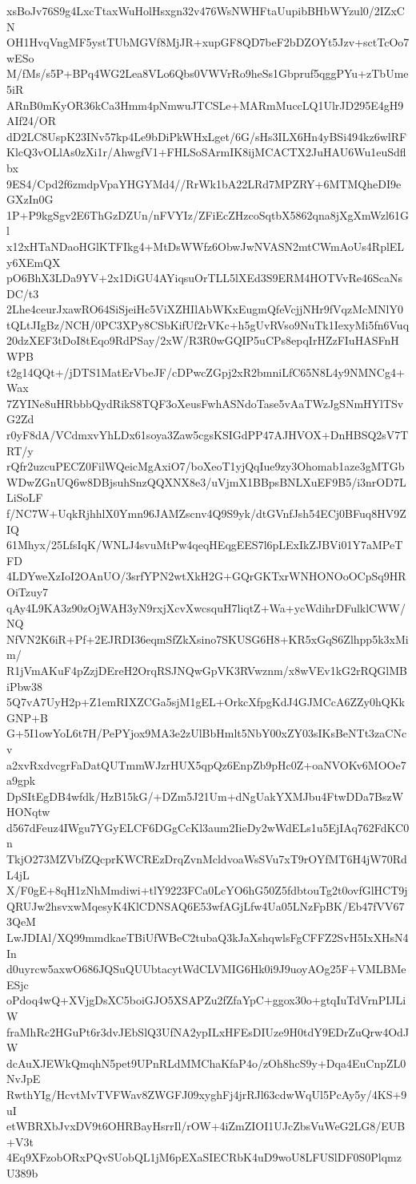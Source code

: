 xsBoJv76S9g4LxcTtaxWuHolHsxgn32v476WsNWHFtaUupibBHbWYzul0/2IZxCN
OH1HvqVngMF5ystTUbMGVf8MjJR+xupGF8QD7beF2bDZOYt5Jzv+sctTcOo7wESo
M/fMs/s5P+BPq4WG2Lea8VLo6Qbs0VWVrRo9heSs1Gbpruf5qggPYu+zTbUme5iR
ARnB0mKyOR36kCa3Hmm4pNmwuJTCSLe+MARmMuccLQ1UlrJD295E4gH9AIf24/OR
dD2LC8UspK23INv57kp4Le9bDiPkWHxLget/6G/sHs3ILX6Hn4yBSi494kz6wlRF
KlcQ3vOLlAs0zXi1r/AhwgfV1+FHLSoSArmIK8ijMCACTX2JuHAU6Wu1euSdflbx
9ES4/Cpd2f6zmdpVpaYHGYMd4//RrWk1bA22LRd7MPZRY+6MTMQheDI9eGXzIn0G
1P+P9kgSgv2E6ThGzDZUn/nFVYIz/ZFiEcZHzcoSqtbX5862qna8jXgXmWzl61Gl
x12xHTaNDaoHGlKTFIkg4+MtDsWWfz6ObwJwNVASN2mtCWmAoUs4RplELy6XEmQX
pO6BhX3LDa9YV+2x1DiGU4AYiqsuOrTLL5lXEd3S9ERM4HOTVvRe46ScaNsDC/t3
2Lhe4ceurJxawRO64SiSjeiHc5ViXZHIlAbWKxEugmQfeVcjjNHr9fVqzMcMNlY0
tQLtJIgBz/NCH/0PC3XPy8CSbKifUf2rVKc+h5gUvRVso9NuTk1IexyMi5fn6Vuq
20dzXEF3tDoI8tEqo9RdPSay/2xW/R3R0wGQIP5uCPs8epqIrHZzFIuHASFnHWPB
t2g14QQt+/jDTS1MatErVbeJF/cDPwcZGpj2xR2bmniLfC65N8L4y9NMNCg4+Wax
7ZYINe8uHRbbbQydRikS8TQF3oXeusFwhASNdoTase5vAaTWzJgSNmHYlTSvG2Zd
r0yF8dA/VCdmxvYhLDx61soya3Zaw5cgsKSIGdPP47AJHVOX+DnHBSQ2sV7TRT/y
rQfr2uzcuPECZ0FilWQeicMgAxiO7/boXeoT1yjQqIue9zy3Ohomab1aze3gMTGb
WDwZGnUQ6w8DBjsuhSnzQQXNX8e3/uVjmX1BBpsBNLXuEF9B5/i3nrOD7LLiSoLF
f/NC7W+UqkRjhhlX0Ymn96JAMZscnv4Q9S9yk/dtGVnfJsh54ECj0BFuq8HV9ZIQ
61Mhyx/25LfsIqK/WNLJ4svuMtPw4qeqHEqgEES7l6pLExIkZJBVi01Y7aMPeTFD
4LDYweXzIoI2OAnUO/3srfYPN2wtXkH2G+GQrGKTxrWNHONOoOCpSq9HROiTzuy7
qAy4L9KA3z90zOjWAH3yN9rxjXcvXwcsquH7liqtZ+Wa+ycWdihrDFulklCWW/NQ
NfVN2K6iR+Pf+2EJRDI36eqmSfZkXsino7SKUSG6H8+KR5xGqS6Zlhpp5k3xMim/
R1jVmAKuF4pZzjDEreH2OrqRSJNQwGpVK3RVwznm/x8wVEv1kG2rRQGlMBiPbw38
5Q7vA7UyH2p+Z1emRIXZCGa5sjM1gEL+OrkcXfpgKdJ4GJMCcA6ZZy0hQKkGNP+B
G+5I1owYoL6t7H/PePYjox9MA3e2zUlBbHmlt5NbY00xZY03sIKsBeNTt3zaCNcv
a2xvRxdvcgrFaDatQUTmmWJzrHUX5qpQz6EnpZb9pHc0Z+oaNVOKv6MOOe7a9gpk
DpSItEgDB4wfdk/HzB15kG/+DZm5J21Um+dNgUakYXMJbu4FtwDDa7BszWHONqtw
d567dFeuz4IWgu7YGyELCF6DGgCcKl3aum2IieDy2wWdELs1u5EjIAq762FdKC0n
TkjO273MZVbfZQcprKWCREzDrqZvnMcldvoaWsSVu7xT9rOYfMT6H4jW70RdL4jL
X/F0gE+8qH1zNhMmdiwi+tlY9223FCa0LcYO6hG50Z5fdbtouTg2t0ovfGlHCT9j
QRUJw2hsvxwMqesyK4KlCDNSAQ6E53wfAGjLfw4Ua05LNzFpBK/Eb47fVV673QeM
LwJDIAl/XQ99mmdkaeTBiUfWBeC2tubaQ3kJaXshqwlsFgCFFZ2SvH5IxXHsN4In
d0uyrcw5axwO686JQSuQUUbtacytWdCLVMIG6Hk0i9J9uoyAOg25F+VMLBMeESjc
oPdoq4wQ+XVjgDsXC5boiGJO5XSAPZu2fZfaYpC+ggox30o+gtqIuTdVrnPIJLiW
fraMhRc2HGuPt6r3dvJEbSlQ3UfNA2ypILxHFEsDIUze9H0tdY9EDrZuQrw4OdJW
dcAuXJEWkQmqhN5pet9UPnRLdMMChaKfaP4o/zOh8hcS9y+Dqa4EuCnpZL0NvJpE
RwthYIg/HcvtMvTVFWav8ZWGFJ09xyghFj4jrRJl63cdwWqUl5PcAy5y/4KS+9uI
etWBRXbJvxDV9t6OHRBayHsrrIl/rOW+4iZmZIOI1UJcZbsVuWeG2LG8/EUB+V3t
4Eq9XFzobORxPQvSUobQL1jM6pEXaSIECRbK4uD9woU8LFUSlDF0S0PlqmzU389b

